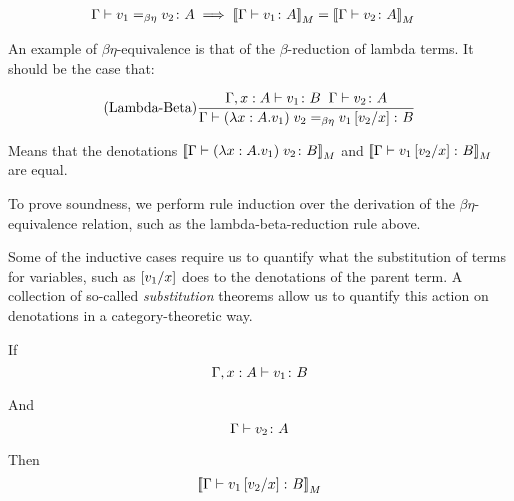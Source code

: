 \documentclass{Report}
\begin{document}




\begin{align}
    \gberelation{v_1}{v_2}{A} & \implies \deno{\gtyperelation{v_1}{A}} = \deno{\gtyperelation{v_2}{A}}
\end{align}

An example of $\beta\eta$-equivalence is that of the $\beta$-reduction of lambda terms. It should be the case that:

\begin{align}
    \treerule{Lambda-Beta}{\typerelation{\gax}{v_1}{B}\s\s\gtyperelation{v_2}{A}}{\gberelation{\apply{(\lam{x}{A}{v_1})}{v_2}}{v_1\ssub{x}{v_2}}{B}}
\end{align}

Means that the denotations $\deno{\gtyperelation{\apply{(\lam{x}{A}{v_1})}{v_2}}{B}}$ and $\deno{\gtyperelation{v_1\ssub{x}{v_2}}{B}}$ are equal.

To prove soundness, we perform rule induction over the derivation of the $\beta\eta$-equivalence relation, such as the lambda-beta-reduction rule above. 

Some of the inductive cases require us to quantify what the substitution of terms for variables, such as $\ssub{x}{v_1}$ does to the denotations of the parent term. A collection of so-called \textit{substitution} theorems allow us to quantify this action on denotations in a category-theoretic way. 


If \begin{equation}
    \typerelation{\gax}{v_1}{B}
\end{equation}

And \begin{equation}
    \typerelation{\G}{v_2}{A}
\end{equation}

Then \begin{equation}
    \deno{\typerelation{\G}{v_1\ssub{x}{v_2}}{B}}
\end{equation}
\end{document}
